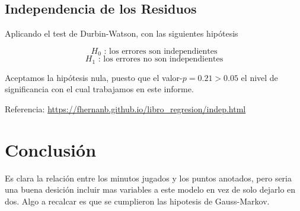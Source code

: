 \documentclass[onecolumn]{IEEEtran}
\begin{document}
    \subsection{Independencia de los Residuos}

    Aplicando el test de Durbin-Watson, con las siguientes hip\'otesis
    
    $$
        H_0\text{ : los errores son independientes}
    $$
    $$
        H_1\text{ : los errores no son independientes}
    $$

    Aceptamos la hip\'otesis nula, puesto que el valor-$p = 0.21 > 0.05$ el nivel de significancia con el cual trabajamos en este informe. 

    Referencia: \url{https://fhernanb.github.io/libro_regresion/indep.html}

    \section{Conclusi\'on}
    Es clara la relaci\'on entre los minutos jugados y los puntos anotados, pero seria una buena desici\'on incluir mas variables a este modelo en vez de solo dejarlo en dos. Algo a recalcar es que se cumplieron las hipotesis de Gauss-Markov.
\end{document}
